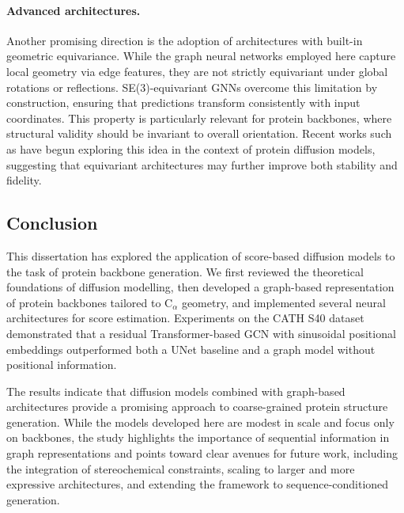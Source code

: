 \documentclass[a4paper,12pt]{article}
\begin{document}
\paragraph{Advanced architectures.}  
Another promising direction is the adoption of architectures with built-in geometric equivariance. While the graph neural networks employed here capture local geometry via edge features, they are not strictly equivariant under global rotations or reflections. SE(3)-equivariant GNNs \citep{thomasTensorFieldNetworks2018,weiler3DSteerableCNNs2018,kondorClebschGordanNetsFully2018,geiger2022E3nnEuclideanNeural,geiger2025EuclideanNeuralNetworks} overcome this limitation by construction, ensuring that predictions transform consistently with input coordinates. This property is particularly relevant for protein backbones, where structural validity should be invariant to overall orientation. Recent works such as \citet{yimDiffusionModelsProtein2024} have begun exploring this idea in the context of protein diffusion models, suggesting that equivariant architectures may further improve both stability and fidelity.

\subsection{Conclusion}\label{subsec:conclusion}
This dissertation has explored the application of score-based diffusion models to the task of protein backbone generation. We first reviewed the theoretical foundations of diffusion modelling, then developed a graph-based representation of protein backbones tailored to C\(_\alpha\) geometry, and implemented several neural architectures for score estimation. Experiments on the CATH S40 dataset demonstrated that a residual Transformer-based GCN with sinusoidal positional embeddings outperformed both a UNet baseline and a graph model without positional information.

The results indicate that diffusion models combined with graph-based architectures provide a promising approach to coarse-grained protein structure generation. While the models developed here are modest in scale and focus only on backbones, the study highlights the importance of sequential information in graph representations and points toward clear avenues for future work, including the integration of stereochemical constraints, scaling to larger and more expressive architectures, and extending the framework to sequence-conditioned generation.

\clearpage
\end{document}
